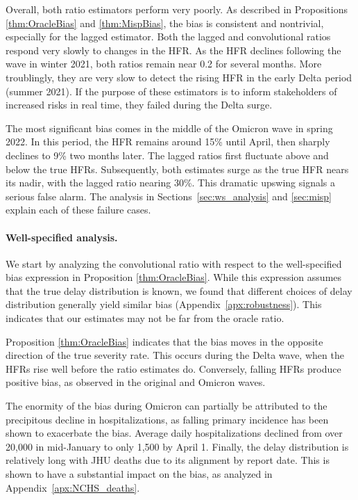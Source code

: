 \documentclass{article}
\newcommand{\djmcomment}[1]{{\color{teal}[DJM: #1]}}
\begin{document}
Overall, both ratio estimators perform very poorly. 
As described in Propositions \ref{thm:OracleBias} and \ref{thm:MispBias}, the bias is consistent and nontrivial, especially for the lagged estimator.
Both the lagged and convolutional ratios respond very slowly to
changes in the HFR. As the HFR declines following the wave in winter 2021, both
ratios remain near 0.2 for several months. More troublingly, they are very slow
to detect the rising HFR in the early Delta period (summer 2021). %
If the purpose of these estimators is to inform stakeholders of increased risks
in real time, they failed during the Delta surge.

The most significant bias comes in the middle of the Omicron wave in spring 2022. 
In this period, the HFR remains around 15\% until April, then sharply declines to 9\% two months later. The lagged ratios first fluctuate above and below the true HFRs. Subsequently, both estimates surge as the true HFR nears its nadir, with the lagged ratio nearing 30\%. This dramatic upswing signals a serious false alarm. 
The analysis in Sections~\ref{sec:ws_analysis} and \ref{sec:misp} explain each
of these failure cases. 

\paragraph{Well-specified analysis.}
We start by analyzing the convolutional ratio with
respect to the well-specified bias expression in Proposition \ref{thm:OracleBias}.
While this expression assumes that the true delay distribution is known, we found
that different choices of delay distribution generally yield similar bias
(Appendix~\ref{apx:robustness}). This indicates that our estimates may not be far
from the oracle ratio.

Proposition \ref{thm:OracleBias} indicates that the bias moves in the opposite direction of the true severity rate. This occurs during the Delta wave, when the HFRs rise well before the ratio estimates do. Conversely, falling HFRs produce positive bias, as observed in the original and Omicron waves.

The enormity of the bias during Omicron can partially be attributed to the precipitous decline in hospitalizations, as falling primary incidence has been shown to exacerbate the bias. Average daily hospitalizations declined from over 20,000 in mid-January to only 1,500 by April 1. 
Finally, the delay distribution is relatively long with JHU deaths due to its alignment by report date. This is shown to have a substantial impact on the bias, as analyzed in Appendix~\ref{apx:NCHS_deaths}.
\end{document}
